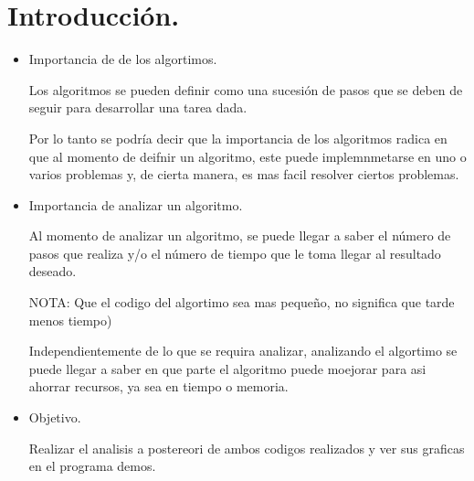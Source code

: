 \documentclass{report}
\begin{document}
	\section* {Introducción.}
	\large 
	\begin{itemize}
		\item
		\begin{bf}
			\large Importancia de de los algortimos. \par
		\end{bf}
	
		\large Los algoritmos se pueden definir como una sucesión de pasos que se deben de seguir para desarrollar una tarea dada. \par
		\large Por lo tanto se podría decir que la importancia de los algoritmos radica en que al momento de deifnir un algoritmo, este puede implemnmetarse en uno o varios problemas y, de cierta manera, es mas facil resolver ciertos problemas. \par
	
		\item
		\begin{bf}
			\large Importancia de analizar un algoritmo. \par
		\end{bf}
		
		\large Al momento de analizar un algoritmo, se puede llegar a saber el número de pasos que realiza y/o el número de tiempo que le toma llegar al resultado deseado. \par
		\begin{bf}
			\large NOTA: Que el codigo del algortimo sea mas pequeño, no significa que tarde menos tiempo) \par
		\end{bf}
		\large Independientemente de lo que se requira analizar, analizando el algortimo se puede llegar a saber en que parte el algoritmo puede moejorar para asi ahorrar recursos, ya sea en tiempo o memoria. \par
	
		\item
		\begin{bf}
			\large Objetivo. \par
		\end{bf}
	
		\large Realizar el analisis a postereori de ambos codigos realizados y ver sus graficas en el programa demos. \par
	\end{itemize}
	
	
\end{document}
